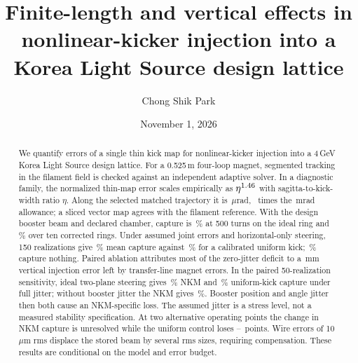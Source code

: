 \documentclass[aps,prab,reprint,amsmath,amssymb,floatfix,longbibliography]{revtex4-2}
\begin{document}
\title{Finite-length and vertical effects in nonlinear-kicker injection into a Korea Light Source design lattice}

\author{Chong Shik Park}
\date{November 1, 2026}



\begin{abstract}
We quantify errors of a single thin kick map for nonlinear-kicker injection into a 4\,GeV Korea Light Source design lattice. For a 0.525\,m four-loop magnet, segmented tracking in the filament field is checked against an independent adaptive solver. In a diagnostic family, the normalized thin-map error scales empirically as $\eta^{1.46}$ with sagitta-to-kick-width ratio $\eta$. Along the selected matched trajectory it is \ThinProdCurrentUrad\,$\mu$rad, \ThinProdRatio\ times the \ResidualAllowMrad\,mrad allowance; a sliced vector map agrees with the filament reference. With the design booster beam and declared chamber, capture is \ChamberNom\,\% at 500 turns on the ideal ring and \SynRingNkm\,\% over ten corrected rings. Under assumed joint errors and horizontal-only steering, 150 realizations give \FinalNkmMean\,\% mean capture against \FinalDipMean\,\% for a calibrated uniform kick; \ZeroCapNkm\,\% capture nothing. Paired ablation attributes most of the zero-jitter deficit to a \AblExitYmm\,mm vertical injection error left by transfer-line magnet errors. In the paired 50-realization sensitivity, ideal two-plane steering gives \VsFullNkm\,\% NKM and \VsFullDip\,\% uniform-kick capture under full jitter; without booster jitter the NKM gives \VsZeroNkm\,\%. Booster position and angle jitter then both cause an NKM-specific loss. The assumed jitter is a stress level, not a measured stability specification. At two alternative operating points the change in NKM capture is unresolved while the uniform control loses \PtDipLossMin--\PtDipLossMax\ points. Wire errors of 10\,$\mu$m rms displace the stored beam by several rms sizes, requiring compensation. These results are conditional on the model and error budget.
\end{abstract}

\maketitle
\clearpage
\end{document}
